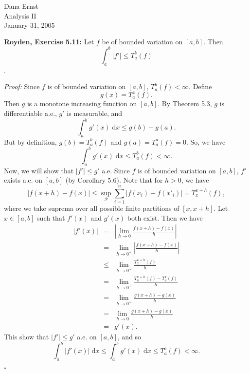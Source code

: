 \documentclass{article}
\newcommand{\dx}{\textrm{d}}
\begin{document}
\begin{flushright}

Dana Ernst \\
Analysis II\\
January 31, 2005\\

\end{flushright}

\medskip

\begin{flushleft}
\textbf{Royden, Exercise 5.11:}  Let $f$ be of bounded variation on $[a,b]$.  Then
$$\int_a^b\left|f'\right|\leq T_a^b(f)$$.

\medskip

\textit{Proof:} Since $f$ is of bounded variation on $[a,b]$, $T_a^b(f)<\infty$.  Define
$$g(x)=T_a^x(f).$$
Then $g$ is a monotone increasing function on $[a,b]$.  By Theorem 5.3, $g$ is differentiable a.e., $g'$ is measurable, and
$$\int_a^b g'(x) \;\dx x \leq g(b)-g(a).$$
But by definition, $g(b)=T_a^b(f)$ and $g(a)=T_a^a(f)=0$.  So, we have
$$\int_a^b g'(x) \;\dx x \leq T_a^b(f)<\infty.$$
Now, we will show that $\left|f'\right| \leq g'$ a.e.  Since $f$ is of bounded variation on $[a,b]$, $f'$ exists a.e. on $[a,b]$ (by Corollary 5.6).  Note that for $h>0$, we have
$$\left|f(x+h)-f(x)\right| \leq \sup_{\mathcal{P}}\sum_{i=1}^n \left|f(x_i)-f({x'}_i)\right|=T_x^{x+h}(f),$$
where we take suprema over all possible finite partitions of $[x,x+h]$.  Let $x\in [a,b]$ such that $f'(x)$ and $g'(x)$ both exist.  Then we have
\begin{eqnarray*}
\left|f'(x)\right|&=&\left| \lim_{h\rightarrow 0} \frac{f(x+h)-f(x)}{h} \right| \\
&=&\lim_{h\rightarrow 0^+} \left| \frac{f(x+h)-f(x)}{h}\right| \\
&\leq &\lim_{h \rightarrow 0^+} \frac{T_{x}^{x+h}(f)}{h} \\
&=&\lim_{h\rightarrow 0^+} \frac{T_a^{x+h}(f)-T_a^x(f)}{h} \\
&=&\lim_{h\rightarrow 0^+} \frac{g(x+h)-g(x)}{h} \\
&=&\lim_{h\rightarrow 0} \frac{g(x+h)-g(x)}{h} \\
&=&g'(x).
\end{eqnarray*}
This show that $\left|f'\right|\leq g'$ a.e. on $[a,b]$, and so
$$\int_a^b \left|f'(x)\right| \; \dx x \leq \int_a^b g'(x) \; \dx x \leq T_a^b(f) <\infty.$$
\begin{flushright}$\square$\end{flushright}

\end{flushleft}
\end{document}
